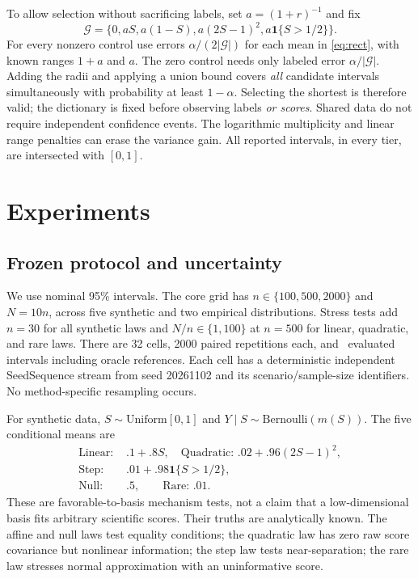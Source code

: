 \documentclass{article}
\newcommand{\ind}{\mathbf{1}}
\begin{document}
To allow selection without sacrificing labels, set $a=(1+r)^{-1}$ and fix
\[
\mathcal G=\{0,aS,a(1-S),a(2S-1)^2,a\ind\{S>1/2\}\}.
\]
For every nonzero control use errors $\alpha/(2|\mathcal G|)$ for each mean in \cref{eq:rect}, with known ranges $1+a$ and $a$. The zero control needs only labeled error $\alpha/|\mathcal G|$. Adding the radii and applying a union bound covers \emph{all} candidate intervals simultaneously with probability at least $1-\alpha$. Selecting the shortest is therefore valid; the dictionary is fixed before observing labels \emph{or scores}. Shared data do not require independent confidence events. The logarithmic multiplicity and linear range penalties can erase the variance gain. All reported intervals, in every tier, are intersected with $[0,1]$.

\section{Experiments}
\subsection{Frozen protocol and uncertainty}
We use nominal 95\% intervals. The core grid has $n\in\{100,500,2000\}$ and $N=10n$, across five synthetic and two empirical distributions. Stress tests add $n=30$ for all synthetic laws and $N/n\in\{1,100\}$ at $n=500$ for linear, quadratic, and rare laws. There are 32 cells, 2000 paired repetitions each, and \TotalIntervals\ evaluated intervals including oracle references. Each cell has a deterministic independent SeedSequence stream from seed 20261102 and its scenario/sample-size identifiers. No method-specific resampling occurs.

For synthetic data, $S\sim\mathrm{Uniform}[0,1]$ and $Y\mid S\sim\mathrm{Bernoulli}(m(S))$. The five conditional means are
\begin{align*}
\text{Linear: }&.1+.8S,\quad\text{Quadratic: }.02+.96(2S-1)^2,\\
\text{Step: }&.01+.98\ind\{S>1/2\},\\
\text{Null: }&.5,\qquad\text{Rare: }.01.
\end{align*}
These are favorable-to-basis mechanism tests, not a claim that a low-dimensional basis fits arbitrary scientific scores. Their truths are analytically known. The affine and null laws test equality conditions; the quadratic law has zero raw score covariance but nonlinear information; the step law tests near-separation; the rare law stresses normal approximation with an uninformative score.
\end{document}
